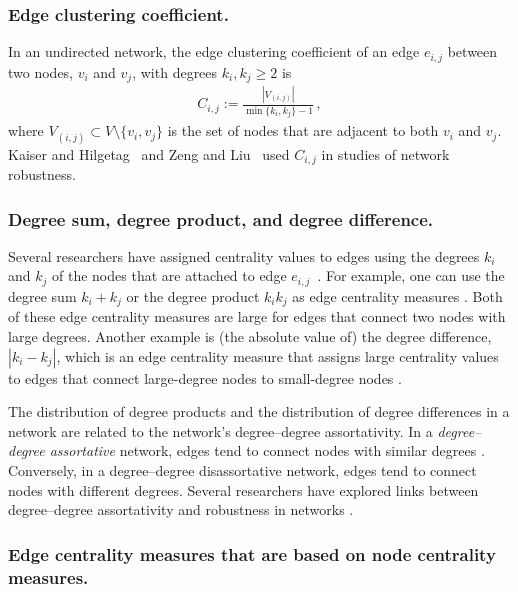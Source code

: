 \documentclass{comnet-mod}
\begin{document}
\subsubsection{Edge clustering coefficient.}

In an undirected network, the edge clustering coefficient of an edge $e_{i,j}$ between two nodes, $v_i$ and $v_j$, with degrees $k_i, k_j \geq 2$ is \cite{Radicchi2004}
\begin{align}
	C_{i,j} := \frac{|V_{(i,j)}|}{\min\{k_i,k_j\}-1}\,,\nonumber
\end{align}
where $V_{(i,j)}\subset V\setminus\{v_i,v_j\}$ is the set of nodes that are adjacent to both $v_i$ and $v_j$. Kaiser and Hilgetag~\cite{Kaiser2004} and Zeng and Liu~ \cite{Zeng2012}  used $C_{i,j}$ in studies of network robustness.


\subsubsection{Degree sum, degree product, and degree difference.}

Several researchers have assigned centrality values to edges using the degrees $k_i$ and $k_j$ of the nodes that are attached to edge $e_{i,j}$~\cite{Holme2002, Kaiser2004, Zeng2012}. For example, one can use the degree sum $k_i + k_j$ or the degree product $k_ik_j$ as edge centrality measures \cite{Holme2002, Wang2008b, Tomassini2023}. Both of these edge centrality measures are large for edges that connect two nodes with large degrees. Another example is (the absolute value of) the degree difference, $|k_i - k_j|$, which is an edge centrality measure that assigns large centrality values to edges that connect large-degree nodes to small-degree nodes \cite{Kaiser2004}. 

The distribution of degree products and the distribution of degree differences in a network are related to the network's degree--degree assortativity. In a \textit{degree--degree assortative} network, edges tend to connect nodes with similar degrees \cite{Newman2002}. Conversely, in a degree--degree disassortative network, edges tend to connect nodes with different degrees. Several researchers have explored links between degree--degree assortativity and robustness in networks \cite{Newman2002, Newman2003b, Herrmann2011, Zhou2012, Trajanovski2013, Shizuka2016}.

\subsubsection{Edge centrality measures that are based on node centrality measures.}
\end{document}
